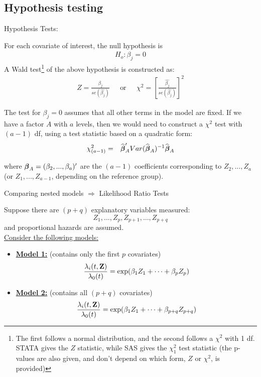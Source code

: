 \documentclass[envcountsect, 10pt, portrait, palatino]{beamer}
\newcommand{\bfbeta}{{\mbox{\boldmath$\beta$}}}
\newcommand{\bfZ}{{\mbox{{\bf Z}}}}
\begin{document}
\subsection{Hypothesis testing}
\begin{frame}{Hypothesis Tests:}

For each covariate of interest, the null hypothesis is
\begin{eqnarray*}
H_o: \beta_j=0
\end{eqnarray*}
{ A Wald test}\footnote{\scriptsize The first follows a normal
distribution, and the second follows a $\chi^2$ with 1 df.  {\sc
STATA} gives the $Z$ statistic, while {\sc SAS} gives the $\chi^2_1$
test statistic  (the p-values are also given, and don't depend on
which form, $Z$ or $\chi^2$, is provided)} of the above hypothesis
is constructed as:
\begin{eqnarray*}
Z = \frac{\hat{\beta_j}}{se(\hat{\beta_j})} & ~~~\mbox{or}~~~ &
\chi^2 = \left [ \frac{\hat{\beta_j}}{se(\hat{\beta_j})}\right ]^2
\end{eqnarray*}
\end{frame}
\begin{frame}
The test for $\beta_j=0$ assumes that all other terms in the
model are fixed. If we have a factor $A$ with $a$ levels, then we would
need to construct a $\chi^2$ test with $(a-1)$ df, using a test
statistic based on a quadratic form:
\begin{eqnarray*}
\chi^2_{(a-1)} & = &
\widehat\bfbeta_A' Var(\widehat\bfbeta_A)^{-1} \widehat\bfbeta_A
\end{eqnarray*}

where $\bfbeta_A = (\beta_{2},..., \beta_{a})'$ are the $(a-1)$
coefficients corresponding to $Z_2,...,Z_a$ (or $Z_1,...,Z_{a-1}$,
depending on the reference group).
\end{frame}
\begin{frame}{Comparing nested models $\Rightarrow$ Likelihood Ratio Tests}

Suppose there are $(p+q)$ explanatory variables measured:
$$Z_1,\ldots,Z_p,Z_{p+1},\ldots,Z_{p+q}$$
and proportional hazards are assumed.
\\[2ex]
\underline{ Consider the following models:}
\begin{itemize}
\item \underline{\bf Model 1:} (contains only the first $p$ covariates)
$$ \frac{\lambda_i(t,\bfZ)}{\lambda_0(t)} =
\exp(\beta_1 Z_1 + \cdots + \beta_p Z_p)$$
\item \underline{\bf Model 2:} (contains all $(p+q)$ covariates)
$$ \frac{\lambda_i(t,\bfZ)}{\lambda_0(t)} =
\exp(\beta_1 Z_1 + \cdots + \beta_{p+q} Z_{p+q})$$
\end{itemize}
\end{frame}
\end{document}
